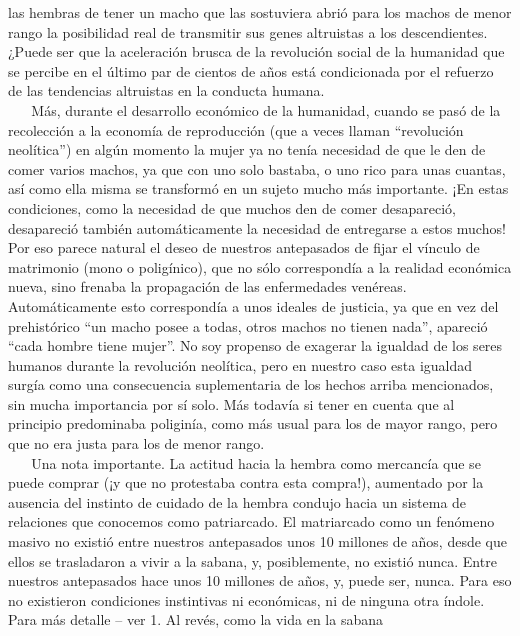 las hembras de tener un macho que las sostuviera abrió para los machos
de menor rango la posibilidad real de transmitir sus genes altruistas a
los descendientes. ¿Puede ser que la aceleración brusca de la revolución
social de la humanidad que se percibe en el último par de cientos de
años está condicionada por el refuerzo de las tendencias altruistas en
la conducta humana.\\
\hspace*{0.333em} ~ ~ Más, durante el desarrollo económico de la
humanidad, cuando se pasó de la recolección a la economía de
reproducción (que a veces llaman ``revolución neolítica'') en algún
momento la mujer ya no tenía necesidad de que le den de comer varios
machos, ya que con uno solo bastaba, o uno rico para unas cuantas, así
como ella misma se transformó en un sujeto mucho más importante. ¡En
estas condiciones, como la necesidad de que muchos den de comer
desapareció, desapareció también automáticamente la necesidad de
entregarse a estos muchos! Por eso parece natural el deseo de nuestros
antepasados de fijar el vínculo de matrimonio (mono o poligínico), que
no sólo correspondía a la realidad económica nueva, sino frenaba la
propagación de las enfermedades venéreas. Automáticamente esto
correspondía a unos ideales de justicia, ya que en vez del prehistórico
``un macho posee a todas, otros machos no tienen nada'', apareció ``cada
hombre tiene mujer''. No soy propenso de exagerar la igualdad de los
seres humanos durante la revolución neolítica, pero en nuestro caso esta
igualdad surgía como una consecuencia suplementaria de los hechos arriba
mencionados, sin mucha importancia por sí solo. Más todavía si tener en
cuenta que al principio predominaba poliginía, como más usual para los
de mayor rango, pero que no era justa para los de menor rango.\\
\hspace*{0.333em} ~ ~ Una nota importante. La actitud hacia la hembra
como mercancía que se puede comprar (¡y que no protestaba contra esta
compra!), aumentado por la ausencia del instinto de cuidado de la hembra
condujo hacia un sistema de relaciones que conocemos como patriarcado.
El matriarcado como un fenómeno masivo no existió entre nuestros
antepasados unos 10 millones de años, desde que ellos se trasladaron a
vivir a la sabana, y, posiblemente, no existió nunca. Entre nuestros
antepasados hace unos 10 millones de años, y, puede ser, nunca. Para eso
no existieron condiciones instintivas ni económicas, ni de ninguna otra
índole. Para más detalle -- ver 1. Al revés, como la vida en la sabana
